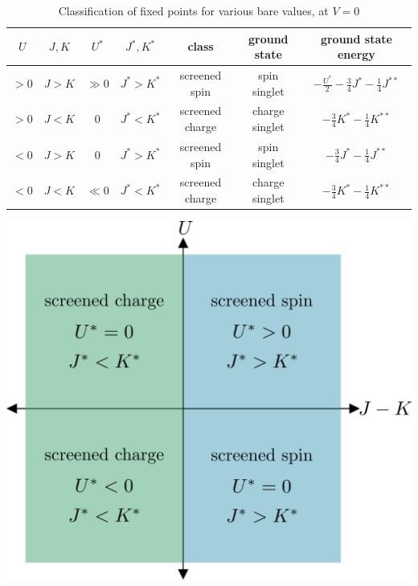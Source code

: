 \documentclass[12pt,twoside]{article}
\numberwithin{equation}{section}
\begin{document}
\begin{table}[htpb]
\renewcommand\arraystretch{1.6}
\centering
\begin{tabular}{|c|c|c|c|c|c|c|}
\hline
\(U \) & \(J,K \) & \(U^*\) &\(J^*,K^*\) & class & ground state & ground state energy\\
\hline
\(>0\)& \(J > K\)& \(\gg 0\)&\(J^*>K^*\) & screened spin & spin singlet & \(- \frac{U^*}{2} - \frac{3}{4}J^* - \frac{1}{4}J^{**}\)\\
\(>0\)& \(J < K\)& \(0\) &\(J^*<K^*\) & screened charge & charge singlet & \(- \frac{3}{4}K^* - \frac{1}{4}K^{**}\)\\
\(<0\)& \(J > K\)& \(0\) &\(J^*>K^*\) & screened spin & spin singlet& \(- \frac{3}{4}J^* - \frac{1}{4}J^{**}\)\\
\(<0\)& \(J < K\)& \(\ll 0\)&\(J^*<K^*\) & screened charge & charge singlet & \(- \frac{3}{4}K^* - \frac{1}{4}K^{**}\)\\
\hline
\end{tabular}
\caption{Classification of fixed points for various bare values, at \(V=0\)}
\label{classes}
\end{table}
\begin{center}
	\includegraphics[scale=0.3]{../figures/phases.png}
	\label{siamphases}
\end{center}
\end{document}
